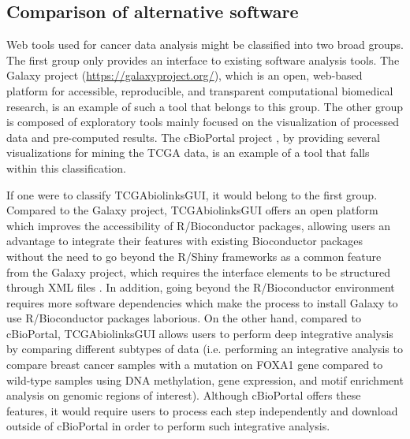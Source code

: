 \subsection{Comparison of alternative software}

Web tools used for cancer data analysis might be classified into two broad groups.
The first group only provides an interface to existing software analysis tools.
The Galaxy project (\href{https://galaxyproject.org/}{https://galaxyproject.org/}), which is an open, web-based platform for accessible, reproducible, and transparent computational biomedical research, is an example of such a tool that belongs to this group.
The other group is composed of exploratory tools mainly focused on the visualization of processed data and pre-computed results. The cBioPortal project \cite{gao2013integrative,cerami2012cbio}, by providing several visualizations for mining the TCGA data, is an example of a tool that falls within this classification.

If one were to classify TCGAbiolinksGUI, it would belong to the first group. Compared to the Galaxy project, TCGAbiolinksGUI offers an open platform which improves the accessibility of R/Bioconductor packages, allowing users an advantage to integrate their features with existing Bioconductor packages without the need to go beyond the R/Shiny frameworks as a common feature from the Galaxy project, which requires the interface elements to be structured through XML files \cite{10.12688/f1000research.9821.1}.
In addition, going beyond the R/Bioconductor environment requires more software dependencies which make the process to install Galaxy to use R/Bioconductor packages laborious.
On the other hand, compared to cBioPortal, TCGAbiolinksGUI allows users to perform deep integrative analysis by comparing different subtypes of data (i.e. performing an integrative analysis to compare breast cancer samples with a mutation on FOXA1 gene compared to wild-type samples using DNA methylation, gene expression, and motif enrichment analysis on genomic regions of interest). Although cBioPortal offers these features, it would require users to process each step independently and download outside of cBioPortal in order to perform such integrative analysis.
